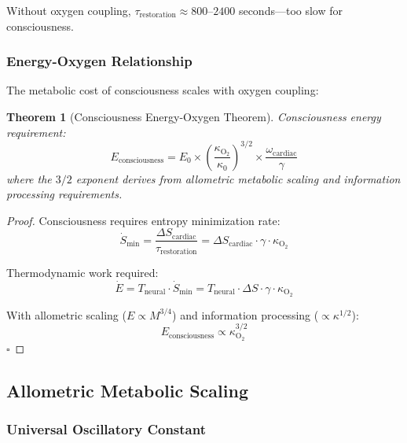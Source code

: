 \documentclass[12pt,twocolumn]{article}
\newtheorem{theorem}{Theorem}[section]
\theoremstyle{remark}
\begin{document}
Without oxygen coupling, $\tau_{\text{restoration}} \approx 800$--$2400$ seconds—too slow for consciousness.

\subsubsection{Energy-Oxygen Relationship}

The metabolic cost of consciousness scales with oxygen coupling:
\begin{theorem}[Consciousness Energy-Oxygen Theorem]
Consciousness energy requirement:
\begin{equation}
E_{\text{consciousness}} = E_0 \times \left(\frac{\kappa_{\text{O}_2}}{\kappa_0}\right)^{3/2} \times \frac{\omega_{\text{cardiac}}}{\gamma}
\end{equation}
where the $3/2$ exponent derives from allometric metabolic scaling and information processing requirements.
\end{theorem}

\begin{proof}
Consciousness requires entropy minimization rate:
\begin{equation}
\dot{S}_{\text{min}} = \frac{\Delta S_{\text{cardiac}}}{\tau_{\text{restoration}}} = \Delta S_{\text{cardiac}} \cdot \gamma \cdot \kappa_{\text{O}_2}
\end{equation}

Thermodynamic work required:
\begin{equation}
\dot{E} = T_{\text{neural}} \cdot \dot{S}_{\text{min}} = T_{\text{neural}} \cdot \Delta S \cdot \gamma \cdot \kappa_{\text{O}_2}
\end{equation}

With allometric scaling ($E \propto M^{3/4}$) and information processing ($ \propto \kappa^{1/2}$):
\begin{equation}
E_{\text{consciousness}} \propto \kappa_{\text{O}_2}^{3/2}
\end{equation}
$\square$
\end{proof}

\subsection{Allometric Metabolic Scaling}

\subsubsection{Universal Oscillatory Constant}
\end{document}
